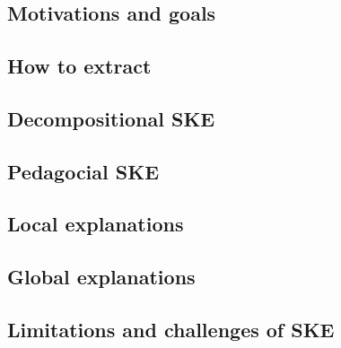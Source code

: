 \section{}\label{sec:ske}

\subsection{Motivations and goals}\label{subsec:ske-motivations-and-goals}

\subsection{How to extract}\label{subsec:how-to-extract}

\subsection{Decompositional \Gls{SKE}}\label{subsec:decompositional-ske}

\subsection{Pedagocial \Gls{SKE}}\label{subsec:pedagogical-ske}

\subsection{Local explanations}\label{subsec:local-explanations}

\subsection{Global explanations}\label{subsec:global-explanations}

\subsection{Limitations and challenges of \Gls{SKE}}\label{subsec:limitations-and-challenges-of-ske}